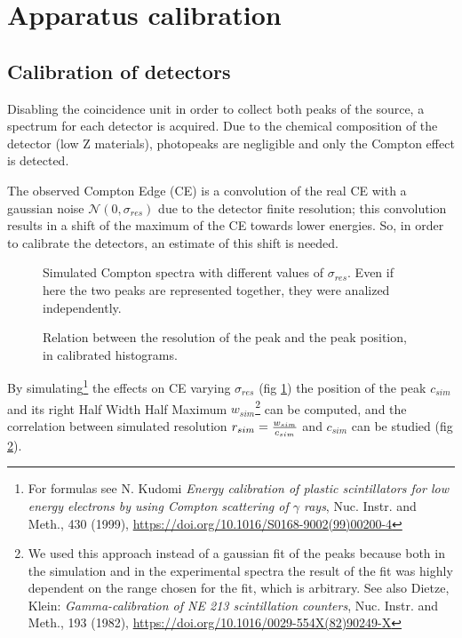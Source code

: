 \documentclass[11pt,a4 paper]{article}
\let\oldfrac\frac
\renewcommand{\frac}[3][d]{\ifthenelse{\equal{#1}{d}}{\oldfrac{#2}{#3}}{\nicefrac{#2}{#3}}}
\begin{document}
\section{Apparatus calibration}

\subsection{Calibration of detectors}
Disabling the coincidence unit in order to collect both peaks of the  source, a spectrum for each detector is acquired. Due to the chemical composition of the detector (low Z materials), photopeaks are negligible and only the Compton effect is detected.

The observed Compton Edge (CE) is a convolution of the real CE with a gaussian noise $\mathcal{N}(0,\sigma_{res})$ due to the detector finite resolution; this convolution results in a shift of the maximum of the CE towards lower energies. So, in order to calibrate the detectors, an estimate of this shift is needed.

\begin{figure}[H]
    \centering
    \caption{Simulated Compton spectra with different values of $\sigma_{res}$. Even if here the two peaks are represented together, they were analized independently.}
    \label{fig:sim:spectra}
\end{figure}

\begin{figure}[H]
    \centering
    \caption{Relation between the resolution of the peak and the peak position, in calibrated histograms.}
    \label{fig:sim}
\end{figure}

By simulating\footnote{For formulas see N. Kudomi \emph{Energy calibration of plastic scintillators for low energy electrons by using Compton scattering of $\gamma$ rays}, Nuc. Instr. and Meth., 430 (1999), \url{https://doi.org/10.1016/S0168-9002(99)00200-4}} the effects on CE varying $\sigma_{res}$ (fig \ref{fig:sim:spectra}) the position of the peak $c_{sim}$ and its right Half Width Half Maximum $w_{sim}$\footnote{We used this approach instead of a gaussian fit of the peaks because both in the simulation and in the experimental spectra the result of the fit was highly dependent on the range chosen for the fit, which is arbitrary. See also Dietze, Klein: \emph{Gamma-calibration of NE 213 scintillation counters}, Nuc. Instr. and Meth., 193 (1982), \url{https://doi.org/10.1016/0029-554X(82)90249-X}} can be computed, and the correlation between simulated resolution $r_{sim} = \frac{w_{sim}}{c_{sim}}$ and $c_{sim}$ can be studied (fig \ref{fig:sim}).
\end{document}
